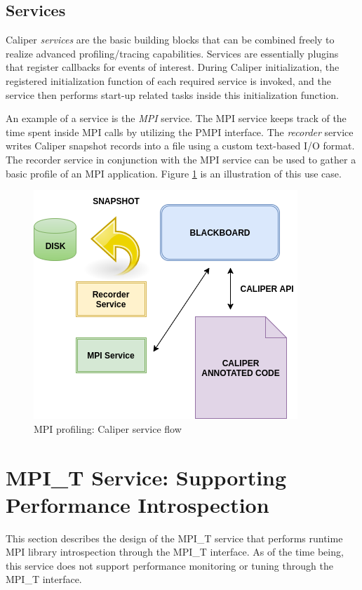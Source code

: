 \subsection{Services}
Caliper \emph{services} are the basic building blocks that can be combined freely to realize advanced profiling/tracing capabilities. Services are essentially plugins that register callbacks for events of interest. During Caliper initialization, the registered initialization function of each required service is invoked, and the service then performs start-up related tasks inside this initialization function. 
\par An example of a service is the \textit{MPI} service. The MPI service keeps track of the time spent inside MPI calls by utilizing the PMPI interface. The \textit{recorder} service writes Caliper snapshot records into a file using a custom text-based I/O format. The recorder service in conjunction with the MPI service can be used to gather a basic profile of an MPI application. Figure \ref{fig:caliservices} is an illustration of this use case. 
\begin{center}
	\begin{figure}[bp!]
         \centering
  \captionsetup{justification=centering}
		\includegraphics[scale=0.7, keepaspectratio]{figures/cali-services}
		\caption{MPI profiling: Caliper service flow}
		\label{fig:caliservices}
	\end{figure}
\end{center}

\section {MPI\_T Service: Supporting Performance Introspection}
This section describes the design of the MPI\_T service that performs runtime MPI library introspection through the MPI\_T interface. As of the time being, this service does not support performance monitoring or tuning through the MPI\_T interface. 
